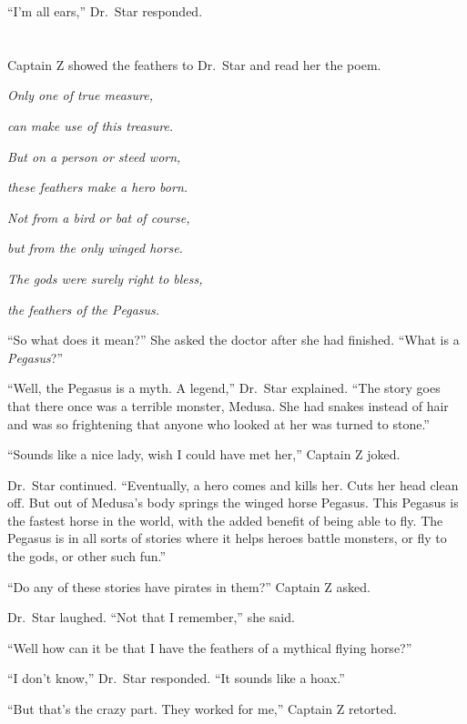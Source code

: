\documentclass[12pt]{extbook}
\begin{document}
  \enquote{I'm all ears,} Dr.~Star responded.
  
  \section{}\label{section-27}
  
  Captain Z showed the feathers to Dr.~Star and read her the poem.
  
  \emph{Only one of true measure,}
  
  \emph{can make use of this treasure.}
  
  \emph{But on a person or steed worn,}
  
  \emph{these feathers make a hero born.}
  
  \emph{Not from a bird or bat of course,}
  
  \emph{but from the only winged horse.}
  
  \emph{The gods were surely right to bless,}
  
  \emph{the feathers of the Pegasus.}
  
  \enquote{So what does it mean?} She asked the doctor after she had
  finished. \enquote{What is a \emph{Pegasus}?}
  
  \enquote{Well, the Pegasus is a myth. A legend,} Dr.~Star explained.
  \enquote{The story goes that there once was a terrible monster, Medusa.
  She had snakes instead of hair and was so frightening that anyone who
  looked at her was turned to stone.}
  
  \enquote{Sounds like a nice lady, wish I could have met her,} Captain Z
  joked.
  
  Dr.~Star continued. \enquote{Eventually, a hero comes and kills her.
  Cuts her head clean off. But out of Medusa's body springs the winged
  horse Pegasus. This Pegasus is the fastest horse in the world, with the
  added benefit of being able to fly. The Pegasus is in all sorts of
  stories where it helps heroes battle monsters, or fly to the gods, or
  other such fun.}
  
  \enquote{Do any of these stories have pirates in them?} Captain Z asked.
  
  Dr.~Star laughed. \enquote{Not that I remember,} she said.
  
  \enquote{Well how can it be that I have the feathers of a mythical
  flying horse?}
  
  \enquote{I don't know,} Dr.~Star responded. \enquote{It sounds like a
  hoax.}
  
  \enquote{But that's the crazy part. They worked for me,} Captain Z
  retorted.
  
\end{document}
